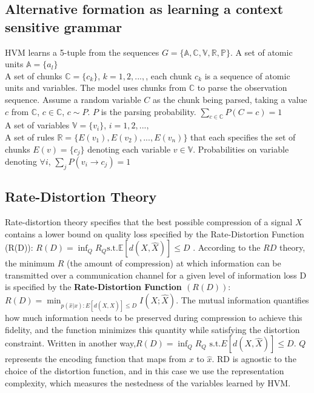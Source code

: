 \documentclass{article} %
\theoremstyle{remark}
\begin{document}
\subsection{Alternative formation as learning a context sensitive grammar}
\label{SI:csg}
HVM learns a 5-tuple from the sequences $\mathit{G} = \{\mathbb{A}, \mathbb{C}, \mathbb{V}, \mathbb{R}, \mathbb{P}\}$. 
A set of atomic units $\mathbb{A} = \{a_l\}$\\
A set of chunks $\mathbb{C} = \{c_k\}$, $k = 1, 2, ..., $, each chunk $c_k$ is a sequence of atomic units and variables.  The model uses chunks from $\mathbb{C}$ to parse the observation sequence. Assume a random variable $C$ as the chunk being parsed, taking a value $c$ from $\mathbb{C}$, $c \in \mathbb{C}$, $c \sim P$. $P$ is the parsing probability.  $\sum_{c\in \mathbb{C}} P(C = c) = 1$\\
A set of variables  $\mathbb{V} = \{v_i\}$, $i = 1, 2, ..., $\\
A set of rules $\mathbb{R} = \{E(v_1), E(v_2), ..., E(v_n)\}$ that each specifies the set of chunks $E(v) = \{c_j\}$ denoting each variable $v \in \mathbb{V}$. Probabilities on variable denoting $\forall i$, $\sum_j P(v_i \rightarrow c_j) = 1$\\

\subsection{Rate-Distortion Theory}
Rate-distortion theory specifies that the best possible compression of a signal $X$ contains a lower bound on quality loss specified by the Rate-Distortion Function (R(D)): $R(D) = \inf_Q R_Q \text{s.t.} \mathbb{E}[d(X, \hat{X})]\leq D$ \citep{Shannon1959, Cover2012}. According to the $RD$ theory, the minimum $R$ (the amount of compression) at which information can be transmitted over a communication channel for a given level of information loss D is specified by the \textbf{Rate-Distortion Function $(R(D))$}: $R(D) = \min_{p(\hat{x}|x): E[d(X, \hat{X})] \leq D} I(X; \hat{X})$. The mutual information quantifies how much information needs to be preserved during compression to achieve this fidelity, and the function minimizes this quantity while satisfying the distortion constraint. Written in another way,$R(D) = \inf_Q R_Q \text{ s.t.} E[d(X, \hat{X})]\leq D$. $Q$ represents the encoding function that maps from $x$ to $\hat{x}$. RD is agnostic to the choice of the distortion function, and in this case we use the representation complexity, which measures the nestedness of the variables learned by HVM. 
\end{document}
